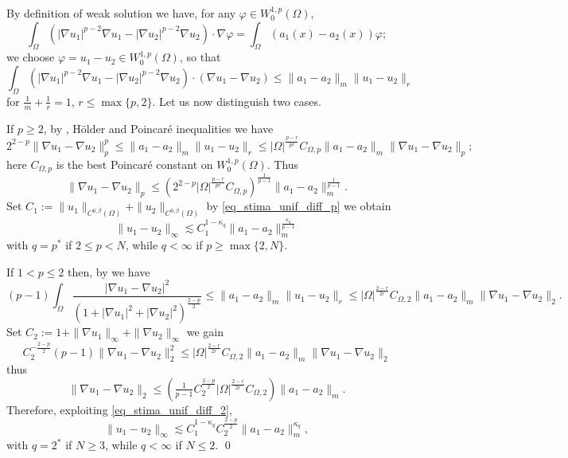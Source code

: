 \documentclass[11pt, reqno]{amsart}
\theoremstyle{definition}
\numberwithin{equation}{section}
\def\norm#1{\|#1\|}
\renewenvironment{proof}[1][\proofname]{\medskip \noindent {\bfseries #1. }}{\qed \bigskip}
\begin{document}
\begin{proof}
By definition of weak solution we have, for any $\varphi \in W^{1,p}_0(\Omega)$,
$$\int_{\Omega} \left( |\nabla u_1|^{p-2} \nabla u_1 - |\nabla u_2|^{p-2} \nabla u_2\right) \cdot \nabla \varphi = \int_{\Omega} (a_1(x) -a_2(x)) \varphi;$$
we choose $\varphi = u_1-u_2 \in W^{1,p}_0(\Omega)$, so that
$$\int_{\Omega} \left( |\nabla u_1|^{p-2} \nabla u_1 - |\nabla u_2|^{p-2} \nabla u_2\right) \cdot (\nabla u_1- \nabla u_2) 
\leq 
 \norm{a_1 -a_2}_{m} \norm{u_1-u_2}_{r} $$
for $\frac{1}{m}+\frac{1}{r}=1$, $r \leq \max\{p,2\}$. 
Let us now distinguish two cases.

\smallskip

If $p \geq 2$, 
by \cite[Section 12(I)]{Lin17}, Hölder and Poincaré inequalities we have
$$ 2^{2-p} \norm{\nabla u_1 - \nabla u_2}_p^p \leq \norm{a_1 -a_2}_{m} \norm{u_1-u_2}_{r} \leq |\Omega|^{\frac{p-r}{p r}} C_{\Omega,p} \norm{a_1 -a_2}_{m} \norm{\nabla u_1- \nabla u_2}_p ;$$
here $C_{\Omega,p}$ is the best Poincaré constant on $W^{1,p}_0(\Omega)$.
Thus
$$ \norm{\nabla u_1 - \nabla u_2}_p \leq \left( 2^{2-p} |\Omega|^{\frac{p-r}{pr}} C_{\Omega,p}\right)^{\frac{1}{p-1}} \norm{a_1 -a_2}_{m}^{\frac{1}{p-1}}.$$
Set
$C_1:=\norm{u_1}_{C^{0,\beta}(\Omega)}+\norm{u_2}_{C^{0,\beta}(\Omega)}$ by \eqref{eq_stima_unif_diff_p} we obtain
$$\norm{u_1-u_2}_{\infty} \lesssim C_1^{1-\kappa_{q}} \norm{a_1 -a_2}_{m}^{\frac{\kappa_{q}}{p-1}}$$
with $q=p^*$ if $2 \leq p<N$, while $q<\infty$ if $p\geq \max\{2,N\}$.

\medskip

If $1 < p \leq 2$ then, by \cite[Section 12(VII)]{Lin17} we have
$$ (p-1)\int_{\Omega} \frac{|\nabla u_1 - \nabla u_2|^2}{(1+|\nabla u_1|^2 + |\nabla u_2|^2)^{\frac{2-p}{2}}} \leq \norm{a_1 -a_2}_{m} \norm{u_1-u_2}_{r} \leq |\Omega|^{\frac{2-r}{2 r}} C_{\Omega,2} \norm{a_1 -a_2}_{m} \norm{\nabla u_1- \nabla u_2}_2.$$
Set
$C_2:=1+\norm{\nabla u_1}_{\infty}+ \norm{\nabla u_2}_{\infty}$ 
we gain
$$C_2^{-\frac{2-p}{2}}(p-1) \norm{\nabla u_1 - \nabla u_2}_2^2 \leq |\Omega|^{\frac{2-r}{2 r}} C_{\Omega,2} \norm{a_1 -a_2}_{m} \norm{\nabla u_1- \nabla u_2}_2$$
thus
$$\norm{\nabla u_1 - \nabla u_2}_2 \leq \left( \tfrac{1}{p-1}C_2^{\frac{2-p}{2}} |\Omega|^{\frac{2-r}{2 r}} C_{\Omega,2}\right) \norm{a_1 -a_2}_{m} .$$
Therefore, exploiting \eqref{eq_stima_unif_diff_2},
$$\norm{u_1 - u_2}_{\infty} \lesssim C_1^{1-\kappa_{q}} C_2^{\frac{2-p}{2}} \norm{a_1 -a_2}_{m}^{\kappa_{q}},$$
with $q=2^*$ if $N\geq 3$, while $q <\infty$ if $N\leq 2$.
\end{proof}
\end{document}
